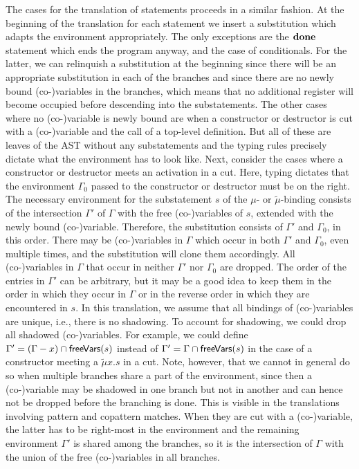 The cases for the translation of statements proceeds in a similar fashion.
At the beginning of the translation for each statement we insert a substitution which adapts the environment appropriately.
The only exceptions are the $\mathbf{done}$ statement which ends the program anyway, and the case of conditionals.
For the latter, we can relinquish a substitution at the beginning since there will be an appropriate substitution in each of the branches and since there are no newly bound (co-)variables in the branches, which means that no additional register will become occupied before descending into the substatements.
The other cases where no (co-)variable is newly bound are when a constructor or destructor is cut with a (co-)variable and the call of a top-level definition.
But all of these are leaves of the AST without any substatements and the typing rules precisely dictate what the environment has to look like.
Next, consider the cases where a constructor or destructor meets an activation in a cut.
Here, typing dictates that the environment $\Gamma_0$ passed to the constructor or destructor must be on the right.
The necessary environment for the substatement $s$ of the $\mu$- or $\tilde\mu$-binding consists of the intersection $\Gamma'$ of $\Gamma$ with the free (co-)variables of $s$, extended with the newly bound (co-)variable.
Therefore, the substitution consists of $\Gamma'$ and $\Gamma_0$, in this order.
There may be (co-)variables in $\Gamma$ which occur in both $\Gamma'$ and $\Gamma_0$, even multiple times, and the substitution will clone them accordingly.
All (co-)variables in $\Gamma$ that occur in neither $\Gamma'$ nor $\Gamma_0$ are dropped.
The order of the entries in $\Gamma'$ can be arbitrary, but it may be a good idea to keep them in the order in which they occur in $\Gamma$ or in the reverse order in which they are encountered in $s$.
In this translation, we assume that all bindings of (co-)variables are unique, i.e., there is no shadowing.
To account for shadowing, we could drop all shadowed (co-)variables.
For example, we could define $\Gamma' = (\Gamma - x) \cap \mathsf{freeVars}(s)$ instead of $\Gamma' = \Gamma \cap \mathsf{freeVars}(s)$ in the case of a constructor meeting a $\tilde\mu x.s$ in a cut.
Note, however, that we cannot in general do so when multiple branches share a part of the environment, since then a (co-)variable may be shadowed in one branch but not in another and can hence not be dropped before the branching is done.
This is visible in the translations involving pattern and copattern matches.
When they are cut with a (co-)variable, the latter has to be right-most in the environment and the remaining environment $\Gamma'$ is shared among the branches, so it is the intersection of $\Gamma$ with the union of the free (co-)variables in all branches.
